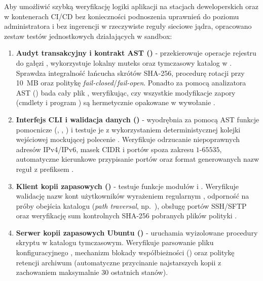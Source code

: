 Aby umożliwić szybką weryfikację logiki aplikacji na stacjach deweloperskich oraz w kontenerach CI/CD bez konieczności podnoszenia uprawnień do poziomu administratora i bez ingerencji w rzeczywiste reguły sieciowe jądra, opracowano zestaw testów jednostkowych działających w sandbox:
\begin{enumerate}
    \item \textbf{Audyt transakcyjny i kontrakt AST ()} - przekierowuje operacje rejestru do gałęzi , wykorzystuje lokalny muteks oraz tymczasowy katalog w . Sprawdza integralność łańcucha skrótów SHA-256, procedurę rotacji przy 10~MB oraz politykę \textit{fail-closed}/\textit{fail-open}. Ponadto za pomocą analizatora AST () bada cały plik , weryfikując, czy wszystkie modyfikacje zapory (cmdlety  i program ) są hermetycznie opakowane w wywołanie .
    \item \textbf{Interfejs CLI i walidacja danych ()} - wyodrębnia za pomocą AST funkcje pomocnicze (, , ) i testuje je z wykorzystaniem deterministycznej kolejki wejściowej mockującej polecenie . Weryfikuje odrzucanie niepoprawnych adresów IPv4/IPv6, masek CIDR i portów spoza zakresu $1\text{-}65535$, automatyczne kierunkowe przypisanie portów oraz format generowanych nazw reguł z prefiksem .
    \item \textbf{Klient kopii zapasowych ()} - testuje funkcje modułów  i . Weryfikuje walidację nazw kont użytkowników wyrażeniem regularnym , odporność na próby obejścia katalogu (\textit{path traversal}, np.\ ), obsługę portów SSH/SFTP oraz weryfikację sum kontrolnych SHA-256 pobranych plików polityki .
    \item \textbf{Serwer kopii zapasowych Ubuntu ()} - uruchamia wyizolowane procedury skryptu  w katalogu tymczasowym. Weryfikuje parsowanie pliku konfiguracyjnego , mechanizm blokady współbieżności () oraz politykę retencji archiwum (automatyczne przycinanie najstarszych kopii z zachowaniem maksymalnie 30 ostatnich stanów).
\end{enumerate}

